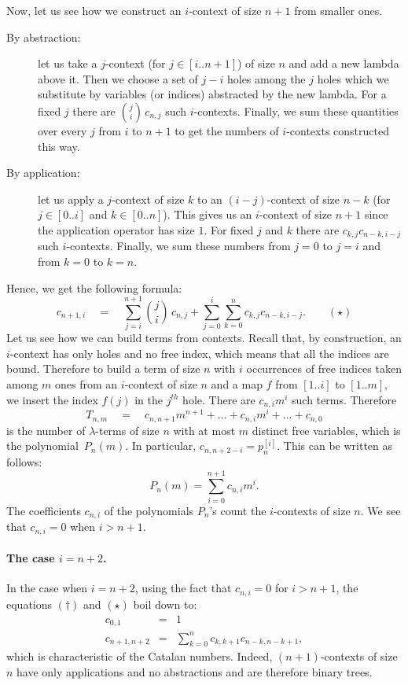 \documentclass{jfp1}
\newcommand{\p}[2]{p^{[#1]}_{#2}}
\begin{document}
Now, let us see how we construct an $i$-context of size $n+1$ from smaller ones.
\begin{description}
\item[By abstraction:] let us take a $j$-context (for $j \in [i..n+1]$) of size $n$ and add a new lambda above it. Then we choose a set of $j-i$ holes among the $j$ holes which we substitute by variables (or indices) abstracted by the new lambda.  For a fixed $j$ there are ${j \choose i}\,c_{n,j}$
  such $i$-contexts.  Finally, we sum these quantities over every $j$ from $i$ to $n+1$ to get the numbers
  of $i$-contexts constructed this way.
\item[By application:] let us apply a $j$-context of size $k$ to an $(i-j)$-context of size $n-k$ (for $j \in [0..i]$ and $k \in [0..n]$). This gives us an $i$-context of size $n+1$ since the application operator has size $1$. For fixed $j$ and $k$ there are $c_{k,j}c_{n-k,i-j}$ such $i$-contexts. Finally, we sum these numbers from $j=0$ to $j=i$ and from $k=0$ to $k=n$.
\end{description}
Hence, we get the following formula:
\[c_{n+1,i} \quad = \quad \sum_{j=i}^{n+1} {j \choose i}\,c_{n,j} + \sum_{j=0}^i
\sum_{k=0}^nc_{k,j} c_{n-k,i-j}. \qquad (\star)\] Let us see how we can build terms from contexts.  Recall that, by construction, an
$i$-context has only holes and no free index, which means that all the indices are
bound.  Therefore to build a term of size $n$ with $i$ occurrences of free indices
taken among $m$ ones from an $i$-context of size $n$ and a map $f$ from $[1..i]$ to
$[1..m]$, we insert the index $f(j)$ in the $j^{th}$ hole.  There are $c_{n,i} m^i$
such terms.  Therefore
\[T_{n,m} \quad = \quad c_{n,n+1} m^{n+1} + \ldots + c_{n,i} m^i + \ldots + c_{n,0}\] is the
number of $\lambda$-terms of size $n$ with at most $m$ distinct free variables, which is the
polynomial~$P_n(m)$.   In particular, $c_{n,n+2-i} = \p{i}{n}$.   This can be written as follows:
\begin{displaymath}
  P_n(m) = \sum_{i=0}^{n+1} c_{n,i} m^i.
\end{displaymath}
The coefficients $c_{n,i}$ of the polynomials $P_n$'s count the $i$-contexts
of size $n$.  We see that $c_{n,i}=0$ when $i>n+1$.

\paragraph{The case $i=n+2$.}
\label{sec:case-i=n+1}

In the case when $i=n+2$, using the fact that $c_{n,i}=0$ for $i>n+1$,  the
equations $(\dagger)$ and $(\star)$ boil down to:
\begin{eqnarray*}
c_{0,1} &=& 1\\
c_{n+1,n+2} & = & \sum_{k=0}^n c_{k,k+1} c_{n-k,n-k+1},
\end{eqnarray*}
which is characteristic of the Catalan numbers.   Indeed, $(n+1)$-contexts of size $n$
have only applications and no abstractions and are therefore binary trees.
\end{document}
